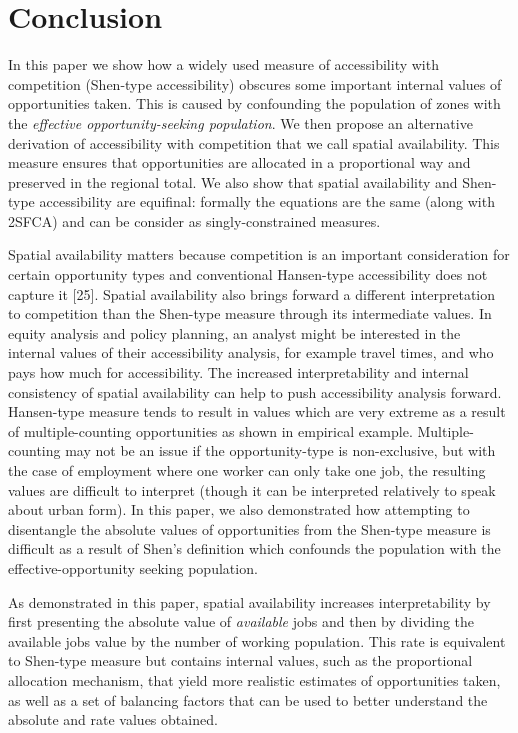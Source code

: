 \documentclass[10pt,letterpaper]{article}
\begin{document}
\newpage

\hypertarget{conclusion}{%
\section{Conclusion}\label{conclusion}}

In this paper we show how a widely used measure of accessibility with
competition (Shen-type accessibility) obscures some important internal
values of opportunities taken. This is caused by confounding the
population of zones with the \emph{effective opportunity-seeking
population}. We then propose an alternative derivation of accessibility
with competition that we call spatial availability. This measure ensures
that opportunities are allocated in a proportional way and preserved in
the regional total. We also show that spatial availability and Shen-type
accessibility are equifinal: formally the equations are the same (along
with 2SFCA) and can be consider as singly-constrained measures.

Spatial availability matters because competition is an important
consideration for certain opportunity types and conventional Hansen-type
accessibility does not capture it {[}25{]}. Spatial availability also
brings forward a different interpretation to competition than the
Shen-type measure through its intermediate values. In equity analysis
and policy planning, an analyst might be interested in the internal
values of their accessibility analysis, for example travel times, and
who pays how much for accessibility. The increased interpretability and
internal consistency of spatial availability can help to push
accessibility analysis forward. Hansen-type measure tends to result in
values which are very extreme as a result of multiple-counting
opportunities as shown in empirical example. Multiple-counting may not
be an issue if the opportunity-type is non-exclusive, but with the case
of employment where one worker can only take one job, the resulting
values are difficult to interpret (though it can be interpreted
relatively to speak about urban form). In this paper, we also
demonstrated how attempting to disentangle the absolute values of
opportunities from the Shen-type measure is difficult as a result of
Shen's definition which confounds the population with the
effective-opportunity seeking population.

As demonstrated in this paper, spatial availability increases
interpretability by first presenting the absolute value of
\emph{available} jobs and then by dividing the available jobs value by
the number of working population. This rate is equivalent to Shen-type
measure but contains internal values, such as the proportional
allocation mechanism, that yield more realistic estimates of
opportunities taken, as well as a set of balancing factors that can be
used to better understand the absolute and rate values obtained.
\end{document}
